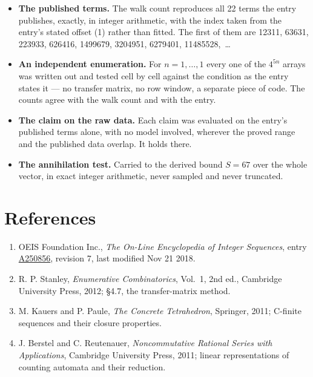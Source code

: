 \documentclass[11pt]{article}
\theoremstyle{definition}
\begin{document}
\begin{itemize}

\item {\bfseries The published terms.} The walk count reproduces all 22 terms the entry publishes, exactly, in integer arithmetic, with the index taken from the entry's stated offset (1) rather than fitted. The first of them are 12311, 63631, 223933, 626416, 1499679, 3204951, 6279401, 11485528,~\dots

\item {\bfseries An independent enumeration.} For $n = 1,\dots,1$ every one of the $4^{5n}$ arrays was written out and tested cell by cell against the condition as the entry states it --- no transfer matrix, no row window, a separate piece of code. The counts agree with the walk count and with the entry.

\item {\bfseries The claim on the raw data.} Each claim was evaluated on the entry's published terms alone, with no model involved, wherever the proved range and the published data overlap. It holds there.

\item {\bfseries The annihilation test.} Carried to the derived bound $S = 67$ over the whole vector, in exact integer arithmetic, never sampled and never truncated.

\end{itemize}

\section{References}

\begin{enumerate}

\item OEIS Foundation Inc., \emph{The On-Line Encyclopedia of Integer Sequences}, entry \href{https://oeis.org/A250856}{A250856}, revision 7, last modified Nov 21 2018.

\item R. P. Stanley, \emph{Enumerative Combinatorics}, Vol.~1, 2nd ed., Cambridge University Press, 2012; \S4.7, the transfer-matrix method.

\item M. Kauers and P. Paule, \emph{The Concrete Tetrahedron}, Springer, 2011; C-finite sequences and their closure properties.

\item J. Berstel and C. Reutenauer, \emph{Noncommutative Rational Series with Applications}, Cambridge University Press, 2011; linear representations of counting automata and their reduction.

\end{enumerate}
\end{document}
